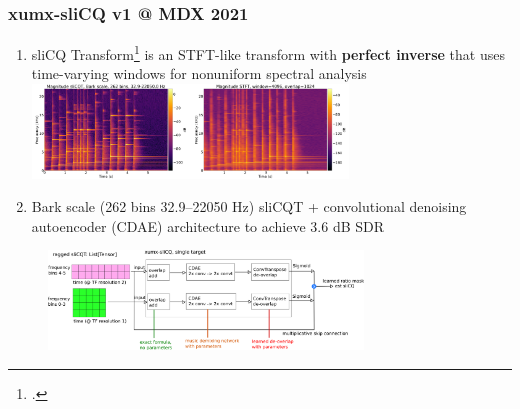 \documentclass[usenames,dvipsnames]{beamer}
\begin{document}
\begin{frame}
	\frametitle{xumx-sliCQ v1 @ MDX 2021}
	\begin{enumerate}
	\item
                sliCQ Transform\footcite{invertiblecqt, slicq} is an STFT-like transform with \textbf{perfect inverse} that uses time-varying windows for nonuniform spectral analysis
		\includegraphics[height=2.5cm]{./images/slicq_spectral.png}
	\item
                Bark scale (262 bins 32.9--22050 Hz) sliCQT + convolutional denoising autoencoder (CDAE) architecture to achieve 3.6 dB SDR
	\end{enumerate}
	\begin{figure}[ht]
		\centering
		\includegraphics[height=2.65cm]{./images/xumx_slicq_pertarget.png}
	\end{figure}
\end{frame}
\end{document}
